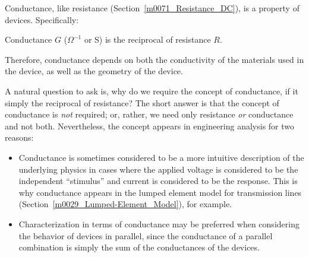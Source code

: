 

\label{m0105_Conductance_DC} %

Conductance, like resistance (Section~\ref{m0071_Resistance_DC}), is a property of devices. Specifically:
%
\begin{mdframed}[backgroundcolor=yellow!20,nobreak=true] 
Conductance 
$G$ ($\Omega^{-1}$ or S) is 
the reciprocal of resistance $R$.
\end{mdframed}
%
Therefore, conductance depends on both the conductivity of the materials used in the device, as well as the geometry of the device.

A natural question to ask is, why do we require the concept of conductance, if it simply the reciprocal of resistance?
The short answer is that the concept of conductance is \emph{not} required; or, rather, we need only resistance \emph{or} conductance and not both.
Nevertheless, the concept appears in engineering analysis for two reasons:
%
\begin{itemize}
\item Conductance is sometimes considered to be a more intuitive description of the underlying physics in cases where the applied voltage is considered to be the independent ``stimulus'' and current is considered to be the response.
This is why conductance appears in the lumped element model for transmission lines (Section~\ref{m0029_Lumped-Element_Model}), for example.
\item Characterization in terms of conductance may be preferred when considering the behavior of devices in parallel, since the conductance of a parallel combination is simply the sum of the conductances of the devices.
\end{itemize}



